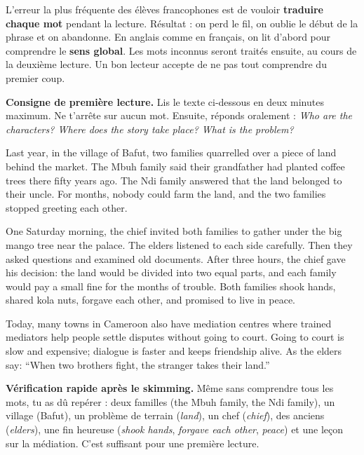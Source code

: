 \documentclass[11pt]{article}
\begin{document}
\begin{attention}
L'erreur la plus fréquente des élèves francophones est de vouloir \textbf{traduire chaque mot} pendant la lecture. Résultat : on perd le fil, on oublie le début de la phrase et on abandonne. En anglais comme en français, on lit d'abord pour comprendre le \textbf{sens global}. Les mots inconnus seront traités ensuite, au cours de la deuxième lecture. Un bon lecteur accepte de ne pas tout comprendre du premier coup.
\end{attention}

\textbf{Consigne de première lecture.} Lis le texte ci-dessous en deux minutes maximum. Ne t'arrête sur aucun mot. Ensuite, réponds oralement : \emph{Who are the characters? Where does the story take place? What is the problem?}

\begin{textebox}
Last year, in the village of Bafut, two families quarrelled over a piece of land behind the market. The Mbuh family said their grandfather had planted coffee trees there fifty years ago. The Ndi family answered that the land belonged to their uncle. For months, nobody could farm the land, and the two families stopped greeting each other.

One Saturday morning, the chief invited both families to gather under the big mango tree near the palace. The elders listened to each side carefully. Then they asked questions and examined old documents. After three hours, the chief gave his decision: the land would be divided into two equal parts, and each family would pay a small fine for the months of trouble. Both families shook hands, shared kola nuts, forgave each other, and promised to live in peace.

Today, many towns in Cameroon also have mediation centres where trained mediators help people settle disputes without going to court. Going to court is slow and expensive; dialogue is faster and keeps friendship alive. As the elders say: “When two brothers fight, the stranger takes their land.”
\end{textebox}

\textbf{Vérification rapide après le skimming.} Même sans comprendre tous les mots, tu as dû repérer : deux familles (the Mbuh family, the Ndi family), un village (Bafut), un problème de terrain (\emph{land}), un chef (\emph{chief}), des anciens (\emph{elders}), une fin heureuse (\emph{shook hands}, \emph{forgave each other}, \emph{peace}) et une leçon sur la médiation. C'est suffisant pour une première lecture.
\end{document}
